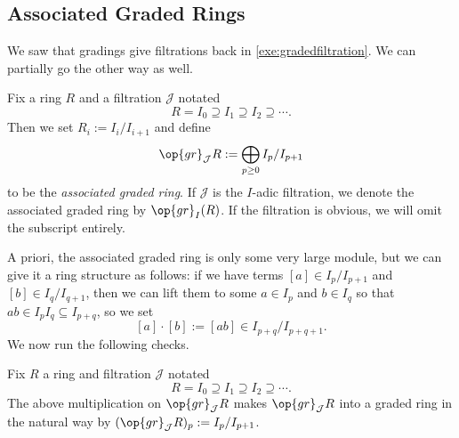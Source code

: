 \subsection{Associated Graded Rings}
We saw that gradings give filtrations back in \autoref{exe:gradedfiltration}. We can partially go the other way as well.
\begin{definition}
	Fix a ring $R$ and a filtration $\mathcal J$ notated
	\[R= I_0\supseteq I_1\supseteq I_2\supseteq\cdots.\]
	Then we set $R_i:=I_i/I_{i+1}$ and define
	\[\op{gr}_{\mathcal J}R:=\bigoplus_{p\ge0}I_p/I_{p+1}\]
	to be the \textit{associated graded ring}. If $\mathcal J$ is the $I$-adic filtration, we denote the associated graded ring by $\op{gr}_I(R)$. If the filtration is obvious, we will omit the subscript entirely.
\end{definition}
A priori, the associated graded ring is only some very large module, but we can give it a ring structure as follows: if we have terms $[a]\in I_p/I_{p+1}$ and $[b]\in I_q/I_{q+1}$, then we can lift them to some $a\in I_p$ and $b\in I_q$ so that $ab\in I_pI_q\subseteq I_{p+q}$, so we set
\[[a]\cdot[b]:=[ab]\in I_{p+q}/I_{p+q+1}.\]
We now run the following checks.
\begin{lemma}
	Fix $R$ a ring and filtration $\mathcal J$ notated
	\[R=I_0\supseteq I_1\supseteq I_2\supseteq\cdots.\]
	The above multiplication on $\op{gr}_\mathcal JR$ makes $\op{gr}_\mathcal JR$ into a graded ring in the natural way by $(\op{gr}_\mathcal JR)_p:=I_p/I_{p+1}$.
\end{lemma}
